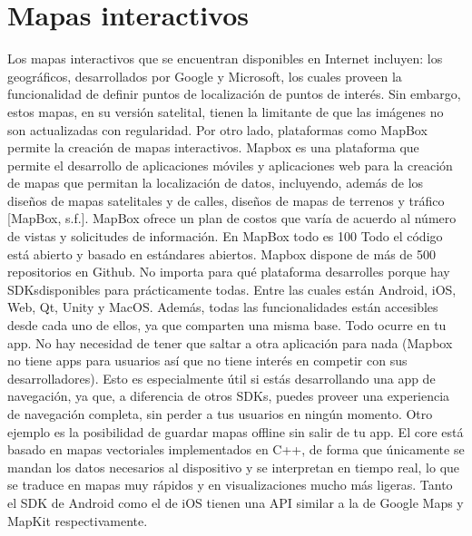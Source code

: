 \section{Mapas interactivos}
Los mapas interactivos que se encuentran disponibles en Internet incluyen: los geográficos, desarrollados por Google y Microsoft, los cuales proveen la funcionalidad de definir puntos de localización de puntos de interés. Sin embargo, estos mapas, en su versión satelital, tienen la limitante de que las imágenes no son actualizadas con regularidad. Por otro lado, plataformas como MapBox permite la creación de mapas interactivos. Mapbox es una plataforma que permite el desarrollo de aplicaciones móviles y aplicaciones web para la creación de mapas que permitan la localización de datos, incluyendo, además de los diseños de mapas satelitales y de calles, diseños de mapas de terrenos y tráfico [MapBox, s.f.]. MapBox ofrece un plan de costos que varía de acuerdo al número de vistas y solicitudes de información. 
En MapBox todo es 100%
Todo el código está abierto y basado en estándares abiertos. Mapbox dispone de más de 500 repositorios en Github. 
No importa para qué plataforma desarrolles porque hay SDKsdisponibles para prácticamente todas. Entre las cuales están Android, iOS, Web, Qt, Unity y MacOS. Además, todas las funcionalidades están accesibles desde cada uno de ellos, ya que comparten una misma base.
Todo ocurre en tu app. No hay necesidad de tener que saltar a otra aplicación para nada (Mapbox no tiene apps para usuarios así que no tiene interés en competir con sus desarrolladores). Esto es especialmente útil si estás desarrollando una app de navegación, ya que, a diferencia de otros SDKs, puedes proveer una experiencia de navegación completa, sin perder a tus usuarios en ningún momento. Otro ejemplo es la posibilidad de guardar mapas offline sin salir de tu app.
El core está basado en mapas vectoriales implementados en C++, de forma que únicamente se mandan los datos necesarios al dispositivo y se interpretan en tiempo real, lo que se traduce en mapas muy rápidos y en visualizaciones mucho más ligeras.
Tanto el SDK de Android como el de iOS tienen una API similar a la de Google Maps y MapKit respectivamente.

